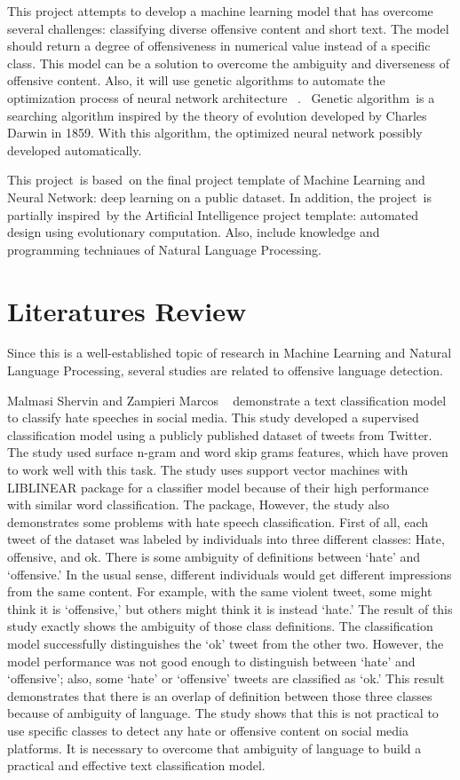\documentclass[11pt, natbib=false]{article}
\begin{document}
This project attempts to develop a machine learning model that has overcome several challenges: classifying diverse offensive content and short text.
The model should return a degree of offensiveness in numerical value instead of a specific class.
This model can be a solution to overcome the ambiguity and diverseness of offensive content.
Also, it will use genetic algorithms to automate the optimization process of neural network architecture ~\cite{andersen2021evolving}. 
Genetic algorithm is a searching algorithm inspired by the theory of evolution developed by Charles Darwin in 1859.
With this algorithm, the optimized neural network possibly developed automatically.

This project is based on the final project template of Machine Learning and Neural Network: deep learning on a public dataset.
In addition, the project is partially inspired by the Artificial Intelligence project template: automated design using evolutionary computation.
Also, include knowledge and programming techniaues of Natural Language Processing. 

\section{Literatures Review}
Since this is a well-established topic of research in Machine Learning and Natural Language Processing, several studies are related to offensive language detection. 

Malmasi Shervin and Zampieri Marcos ~\cite{malmasi2017detecting} demonstrate a text classification model to classify hate speeches in social media. This study developed a supervised classification model using a publicly published dataset of tweets from Twitter.
The study used surface n-gram and word skip grams features, which have proven to work well with this task. The study uses support vector machines with LIBLINEAR package for a classifier model because of their high performance with similar word classification.
The package, However, the study also demonstrates some problems with hate speech classification. First of all, each tweet of the dataset was labeled by individuals into three different classes: Hate, offensive, and ok.
There is some ambiguity of definitions between ‘hate’ and ‘offensive.’ In the usual sense, different individuals would get different impressions from the same content.
For example, with the same violent tweet, some might think it is ‘offensive,’ but others might think it is instead ‘hate.’
The result of this study exactly shows the ambiguity of those class definitions. The classification model successfully distinguishes the ‘ok’ tweet from the other two. However, the model performance was not good enough to distinguish between ‘hate’ and ‘offensive’; also, some ‘hate’ or ‘offensive’ tweets are classified as ‘ok.’
This result demonstrates that there is an overlap of definition between those three classes because of ambiguity of language.
The study shows that this is not practical to use specific classes to detect any hate or offensive content on social media platforms.
It is necessary to overcome that ambiguity of language to build a practical and effective text classification model. 
\end{document}
